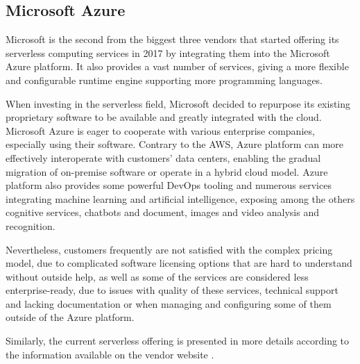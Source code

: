 \subsection{Microsoft Azure}

Microsoft is the second from the biggest three vendors that started offering its serverless computing services in 2017 by integrating them into the Microsoft Azure platform. It also provides a vast number of services, giving a more flexible and configurable runtime engine supporting more programming languages.

When investing in the serverless field, Microsoft decided to repurpose its existing proprietary software to be available and greatly integrated with the cloud. Microsoft Azure is eager to cooperate with various enterprise companies, especially using their software. Contrary to the AWS, Azure platform can more effectively interoperate with customers' data centers, enabling the gradual migration of on-premise software or operate in a hybrid cloud model. Azure platform also provides some powerful DevOps tooling and numerous services integrating machine learning and artificial intelligence, exposing among the others cognitive services, chatbots and document, images and video analysis and recognition.

Nevertheless, customers frequently are not satisfied with the complex pricing model, due to complicated software licensing options that are hard to understand without outside help, as well as some of the services are considered less enterprise-ready, due to issues with quality of these services, technical support and lacking documentation or when managing and configuring some of them outside of the Azure platform.

Similarly, the current serverless offering is presented in more details according to the information available on the vendor website \cite{AzureServerlessOffering}.


